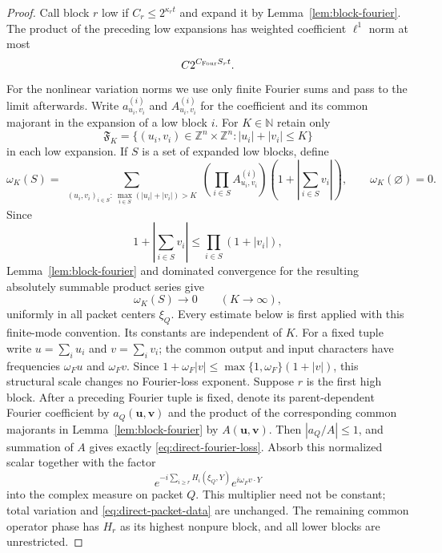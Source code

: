 \documentclass[11pt]{article}
\numberwithin{equation}{section}
\theoremstyle{remark}
\theoremstyle{definition}
\begin{document}
\begin{proof}
Call block $r$ low if $C_r\le2^{\kappa_rt}$ and expand it by
Lemma~\ref{lem:block-fourier}.  The product of the preceding low
expansions has weighted coefficient $\ell^1$ norm at most
\begin{equation}\label{eq:direct-fourier-loss}
 C2^{C_{\rm Four}S_rt}.
\end{equation}
For the nonlinear variation norms we use only finite Fourier sums and pass to
the limit afterwards.  Write
$a^{(i)}_{u_i,v_i}$ and $A^{(i)}_{u_i,v_i}$ for the coefficient and its
common majorant in the expansion of a low block $i$.  For $K\in\mathbb N$
retain only
\[
 \mathfrak F_K=\{(u_i,v_i)\in\mathbb Z^n\times\mathbb Z^n:
                    |u_i|+|v_i|\le K\}
\]
in each low expansion.  If $S$ is a set of expanded low blocks, define
\begin{equation}\label{eq:direct-fourier-tail}
 \omega_K(S)=
 \sum_{\substack{(u_i,v_i)_{i\in S}:\
       \max_{i\in S}(|u_i|+|v_i|)>K}}
 \left(\prod_{i\in S}A^{(i)}_{u_i,v_i}\right)
 \left(1+\left|\sum_{i\in S}v_i\right|\right),
 \qquad \omega_K(\varnothing)=0.
\end{equation}
Since
\[
 1+\left|\sum_{i\in S}v_i\right|
 \le\prod_{i\in S}(1+|v_i|),
\]
Lemma~\ref{lem:block-fourier} and dominated convergence for the resulting
absolutely summable product series give
\begin{equation}\label{eq:direct-fourier-tail-zero}
 \omega_K(S)\longrightarrow0\qquad(K\to\infty),
\end{equation}
uniformly in all packet centers $\xi_Q$.  Every estimate below is first
applied with this finite-mode convention.  Its constants are independent of
$K$.  For a fixed tuple write $u=\sum_i u_i$ and $v=\sum_i v_i$;
the common output and input characters have frequencies $\omega_F u$ and
$\omega_F v$.  Since $1+\omega_F|v|\le\max\{1,\omega_F\}(1+|v|)$,
this structural scale changes no Fourier-loss exponent.
Suppose $r$ is the first high block.  After a preceding Fourier tuple is
fixed, denote its parent-dependent Fourier coefficient by
$a_Q(\mathbf u,\mathbf v)$ and the product of the corresponding common
majorants in Lemma~\ref{lem:block-fourier} by
$A(\mathbf u,\mathbf v)$.  Then $|a_Q/A|\le1$, and summation of $A$
gives exactly \eqref{eq:direct-fourier-loss}.  Absorb this normalized
scalar together with the factor
\[
 e^{-i\sum_{i\ge r}H_i(\xi_Q,Y)}e^{i\omega_F v\cdot Y}
\]
into the complex measure on packet $Q$.  This multiplier need not be
constant; total variation and \eqref{eq:direct-packet-data} are unchanged.
The remaining common operator phase has $H_r$ as its highest nonpure
block, and all lower blocks are unrestricted.


\end{proof}
\end{document}
